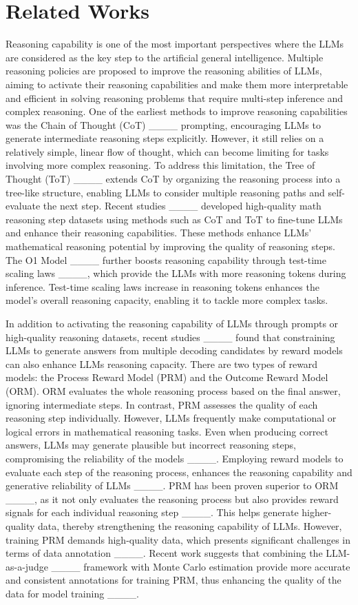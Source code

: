 \section{Related Works}
Reasoning capability is one of the most important perspectives where the LLMs are considered as the key step to the artificial general intelligence. Multiple reasoning policies are proposed to improve the reasoning abilities of LLMs, aiming to activate their reasoning capabilities and make them more interpretable and efficient in solving reasoning problems that require multi-step inference and complex reasoning. One of the earliest methods to improve reasoning capabilities was the Chain of Thought (CoT) ____ prompting, encouraging LLMs to generate intermediate reasoning steps explicitly. However, it still relies on a relatively simple, linear flow of thought, which can become limiting for tasks involving more complex reasoning. To address this limitation, the Tree of Thought (ToT) ____ extends CoT by organizing the reasoning process into a tree-like structure, enabling LLMs to consider multiple reasoning paths and self-evaluate the next step. Recent studies ____ developed high-quality math reasoning step datasets using methods such as CoT and ToT to fine-tune LLMs and enhance their reasoning capabilities. These methods enhance LLMs' mathematical reasoning potential by improving the quality of reasoning steps. The O1 Model ____ further boosts reasoning capability through test-time scaling laws ____, which provide the LLMs with more reasoning tokens during inference. Test-time scaling laws increase in reasoning tokens enhances the model’s overall reasoning capacity, enabling it to tackle more complex tasks.

In addition to activating the reasoning capability of LLMs through prompts or high-quality reasoning datasets, recent studies ____ found that constraining LLMs to generate answers from multiple decoding candidates by reward models can also enhance LLMs reasoning capacity. There are two types of reward models: the Process Reward Model (PRM) and the Outcome Reward Model (ORM). ORM evaluates the whole reasoning process based on the final answer, ignoring intermediate steps. In contrast, PRM assesses the quality of each reasoning step individually. However, LLMs frequently make computational or logical errors in mathematical reasoning tasks. Even when producing correct answers, LLMs may generate plausible but incorrect reasoning steps, compromising the reliability of the models ____. Employing reward models to evaluate each step of the reasoning process, enhances the reasoning capability and generative reliability of LLMs ____. PRM has been proven superior to ORM ____, as it not only evaluates the reasoning process but also provides reward signals for each individual reasoning step ____. This helps generate higher-quality data, thereby strengthening the reasoning capability of LLMs. However, training PRM demands high-quality data, which presents significant challenges in terms of data annotation ____. Recent work suggests that combining the LLM-as-a-judge ____ framework with Monte Carlo estimation provide more accurate and consistent annotations for training PRM, thus enhancing the quality of the data for model training ____.

\vspace{-0.08cm}